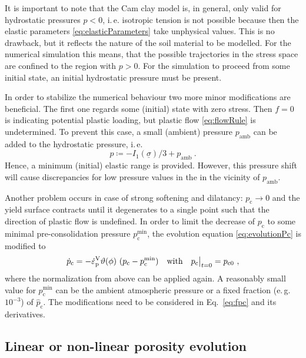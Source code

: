 \documentclass[paper=a4, twoside, pagesize]{scrartcl}
\newcommand{\tensor}[1]{\underline{#1}}
\renewcommand{\c}{\text{c}}
\newcommand{\p}{\text{p}}
\newcommand{\with}{\text{with}}
\newcommand{\minus}{-}
\begin{document}
It is important to note that the Cam clay model is, in general, only valid for hydrostatic pressures $p<0$, i.\,e. isotropic tension is not possible because then the elastic parameters \eqref{eq:elasticParameters} take unphysical values. This is no drawback, but it reflects the nature of the soil material to be modelled. For the numerical simulation this means, that the possible trajectories in the stress space are confined to the region with $p>0$. For the simulation to proceed from some initial state, an initial hydrostatic pressure must be present. 

\par
In order to stabilize the numerical behaviour two more minor modifications are beneficial. The first one regards some (initial) state with zero stress. Then $f=0$ is indicating potential plastic loading, but plastic flow \eqref{eq:flowRule} is undetermined. To prevent this case, a small (ambient) pressure $p_\text{amb}$ can be added to the hydrostatic pressure, i.\,e.
\begin{equation}
  p \coloneqq \minus I_1(\tensor\sigma)/3 + p_\text{amb} \ .
\end{equation}
Hence, a minimum (initial) elastic range is provided. However, this pressure shift will cause discrepancies for low pressure values in the in the vicinity of $p_\text{amb}$.
\par
Another problem occurs in case of strong softening and dilatancy: $p_\c\rightarrow 0$ and the yield surface contracts until it degenerates to a single point such that the direction of plastic flow is undefined. In order to limit the decrease of $p_\c$ to some minimal pre-consolidation pressure $p^\text{min}_\c$, the evolution equation \eqref{eq:evolutionPc} is modified to
\begin{equation}\label{eq:pcMin}
  \dot{p}_\c = \minus\dot{\varepsilon}_\p^\text{V} \vartheta(\phi)\ (p_\c - p^\text{min}_\c) \quad\with\quad p_\c\big{|}_{t=0} = p_{\c0} \ ,
\end{equation}
where the normalization from above can be applied again. A reasonably small value for $p^\text{min}_\c$ can be the ambient atmospheric pressure or a fixed fraction (e.\,g. $10^{\minus3}$) of $\hat{p}_\c$. The modifications need to be considered in Eq.~\eqref{eq:fpc} and its derivatives.

\subsection{Linear or non-linear porosity evolution}\label{subsec:PorosityEvolution}
\end{document}

